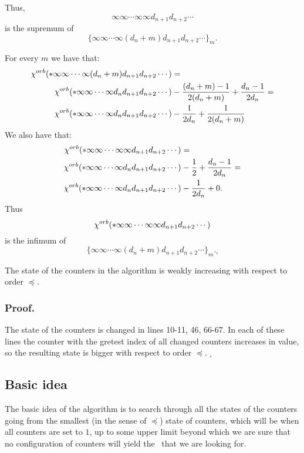 Thus, 
\begin{equation}
\infty\infty\cdots\infty \infty d_{n+1} d_{n+2}\cdots
\end{equation} 
is the supremum of 
\begin{equation}
\{\infty\infty\cdots\infty (d_n+m) d_{n+1} d_{n+2}\cdots\}_m.
\end{equation}

For every $m$ we have that: 
\begin{align}
{\chi^{orb}(*\infty\infty\cdots\infty (d_n+m) d_{n+1} d_{n+2}\cdots)} &= \\ 
{\chi^{orb}(*\infty\infty\cdots\infty d_n d_{n+1} d_{n+2}\cdots)} 
&- \frac{(d_n+m)-1}{2(d_n+m)} + \frac{d_n-1}{2d_n} = \notag \\ 
{\chi^{orb}(*\infty\infty\cdots\infty d_n d_{n+1} d_{n+2}\cdots)} &- 
\frac{1}{2d_n} + \frac{1}{2(d_n+m)}
\end{align}
We also have that:
\begin{align}
{\chi^{orb}(*\infty\infty\cdots\infty \infty d_{n+1} d_{n+2}\cdots)} &= \\
{\chi^{orb}(*\infty\infty\cdots\infty d_n d_{n+1} d_{n+2}\cdots)} 
&- \frac{1}{2} + \frac{d_n-1}{2d_n} = \notag \\ 
{\chi^{orb}(*\infty\infty\cdots\infty d_n d_{n+1} d_{n+2}\cdots)} &- \frac{1}{2d_n} + 0.
\end{align}
Thus 
\begin{equation}
{\chi^{orb}(*\infty\infty\cdots\infty \infty d_{n+1} d_{n+2}\cdots)}
\end{equation} 
is the infimum of 
\begin{equation}
\{\infty\infty\cdots\infty (d_n+m) d_{n+1} d_{n+2}\cdots\}_m. _\square
\end{equation}
\begin{lemma}
The state of the counters in the algorithm is weakly increasing with respect to order $\preceq$. 
\end{lemma}
\subsubsection{Proof.}
The state of the counters is changed in lines 10-11, 46, 66-67. In each of these lines 
the counter with the gretest index of all changed counters increases in value, so 
the resulting state is bigger with respect to order $\preceq$. $_\square$

\subsection{Basic idea}\label{basic idea}
The basic idea of the algorithm is to search through all the states of the counters going 
from the smallest (in the sense of $\preceq$) state of counters, which will be when all counters 
are set to $1$, up to some upper limit beyond which we are sure that no configuration of 
counters will yield the \Eoc\ that we are looking for. 

